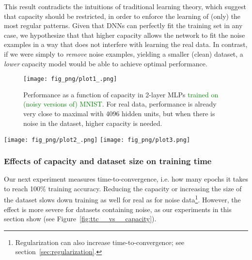 \documentclass{article}
\newcommand{\af}[1]{\textcolor{green}{#1}}
\newcommand{\af}[1]{\textcolor{black}{#1}}
\begin{document}
This result contradicts the intuitions of traditional learning theory, which suggest that capacity should be restricted, in order to enforce the learning of (only) the most regular patterns.
Given that DNNs can perfectly fit the training set in any case, we hypothesize that that higher capacity allows the network to fit the noise examples in a way that does not interfere with learning the real data.
In contrast, if we were simply to \emph{remove} noise examples, yielding a smaller (clean) dataset, a \emph{lower} capacity model would be able to achieve optimal performance. 
	
\begin{figure}[!ht]
\centering
\texttt{[image: fig\_png/plot1\_.png]}
\caption{Performance as a function of capacity in 2-layer MLPs \af{trained on (noisy versions of) MNIST}. For real data, performance is already very close to maximal with 4096 hidden units, but when there is noise in the dataset, higher capacity is needed.}
\label{fig:val_acc__vs__capacity}
\end{figure}
	
	
\begin{figure*}[!t]
   \center
  \subfigure
  {
    \texttt{[image: fig\_png/plot2\_.png]}
  }
  \hspace{1mm}
  \subfigure
  {
    \texttt{[image: fig\_png/plot3.png]}
  }
   \caption{
Time to convergence as a function of capacity with dataset size fixed to 50000 (left), or dataset size with capacity fixed to 4096 units (right).
``Noise level'' denotes to the proportion of training points whose inputs are replaced by Gaussian noise.
Because of the patterns underlying real data, having more capacity/data does not decrease/increase training time as much as it does for noise data.
}
   \label{fig:ttc__vs__capacity}
\end{figure*}


\subsubsection{Effects of capacity and dataset size on training time}
Our next experiment measures time-to-convergence, i.e. how many epochs it takes to reach 100\% training accuracy.
Reducing the capacity or increasing the size of the dataset slows down training as well for real as for noise data\footnote{
Regularization can also increase time-to-convergence; see section~\ref{sec:regularization}.
}.
However, the effect is more severe for datasets containing noise, as our experiments in this section show (see Figure~\ref{fig:ttc__vs__capacity}).
\end{document}
